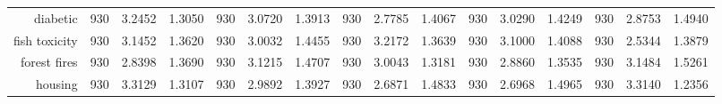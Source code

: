 \begin{table}[H]
{\begin{tabular}{rccccccccccccccc}
			diabetic                            & 930                                     & 3.2452                                                                    & 1.3050          & 930                            & 3.0720                                                                    & 1.3913          & 930                             & \cellcolor[rgb]{ .776,  .937,  .808}\textcolor[rgb]{ 0,  .38,  0}{2.7785}          & 1.4067          & 930                             & 3.0290                                                                    & 1.4249          & 930                             & 2.8753                                                                    & 1.4940          \\
			fish toxicity                       & 930                                     & 3.1452                                                                    & 1.3620          & 930                            & 3.0032                                                                    & 1.4455          & 930                             & 3.2172                                                                             & 1.3639          & 930                             & 3.1000                                                                    & 1.4088          & 930                             & \cellcolor[rgb]{ .776,  .937,  .808}\textcolor[rgb]{ 0,  .38,  0}{2.5344} & 1.3879          \\
			forest fires                        & 930                                     & \cellcolor[rgb]{ .776,  .937,  .808}\textcolor[rgb]{ 0,  .38,  0}{2.8398} & 1.3690          & 930                            & 3.1215                                                                    & 1.4707          & 930                             & 3.0043                                                                             & 1.3181          & 930                             & 2.8860                                                                    & 1.3535          & 930                             & 3.1484                                                                    & 1.5261          \\
			housing                             & 930                                     & 3.3129                                                                    & 1.3107          & 930                            & 2.9892                                                                    & 1.3927          & 930                             & \cellcolor[rgb]{ .776,  .937,  .808}\textcolor[rgb]{ 0,  .38,  0}{2.6871}          & 1.4833          & 930                             & 2.6968                                                                    & 1.4965          & 930                             & 3.3140                                                                    & 1.2356          \\

\end{tabular}}
\end{table}
